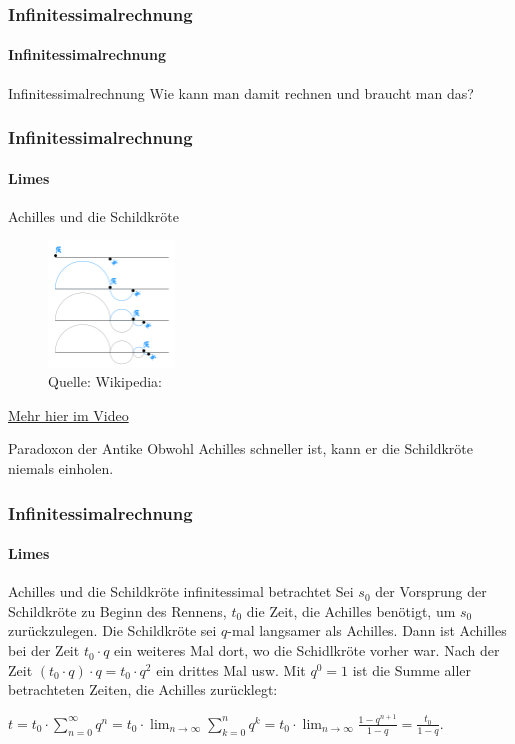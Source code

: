 \documentclass{beamer}
\begin{document}
\begin{frame}
    \frametitle{Infinitessimalrechnung}
\framesubtitle{Infinitessimalrechnung}
    \begin{block}{Infinitessimalrechnung}
        Wie kann man damit rechnen und braucht man das?
\end{block}
 \end{frame}


 \begin{frame}
    \frametitle{Infinitessimalrechnung}
\framesubtitle{Limes}
    \begin{block}{Achilles und die Schildkröte}
\begin{figure}[H]
      \centering
    \includegraphics[width=0.3\textwidth]{images/Zeno_Achilles_Paradox}
      \caption{Quelle: Wikipedia: }
\end{figure}
\href{https://www.youtube.com/watch?v=X8Qksx_Ng9k}{Mehr hier im Video}
\end{block}
  \begin{block}{Paradoxon der Antike}
 Obwohl Achilles schneller ist, kann er die Schildkröte niemals einholen.
\end{block}
 \end{frame}


\begin{frame}
    \frametitle{Infinitessimalrechnung}
\framesubtitle{Limes}
    \begin{block}{Achilles und die Schildkröte infinitessimal betrachtet}
Sei $s_0$ der Vorsprung der Schildkröte zu Beginn des Rennens, $t_0$ die Zeit, die Achilles benötigt, um $s_0$ zurückzulegen. Die Schildkröte sei $q$-mal langsamer als Achilles.
Dann ist Achilles  bei der Zeit $t_0 \cdot q$ ein weiteres Mal dort, wo die Schidlkröte vorher war. 
Nach der Zeit $(t_0 \cdot q) \cdot q = t_0 \cdot q^2$ ein drittes Mal usw.
Mit $q^0 = 1$ ist die Summe aller betrachteten Zeiten, die Achilles zurücklegt:

$t = t_0 \cdot \sum_{n=0}^\infty q^n = t_0 \cdot \lim_{n \to \infty} \sum_{k=0}^{n} q^{k} = t_0 \cdot \lim_{n \to \infty} \frac{1 - q^{n+1}}{1 -q} = \frac{t_0}{1 -q}$.
\end{block}
 \end{frame}
\end{document}
